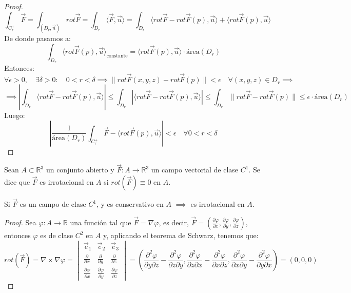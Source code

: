 \begin{proof}
    $$ \int_{C_r^+} \vec{F} = \int_{(D_r, \vec{n})} rot\vec{F} = \int_{D_r} \langle \vec{F}, \vec{u} \rangle = \int_{D_r} \langle rot\vec{F} - rot\vec{F} (p), \vec{u} \rangle + \langle rot\vec{F} (p), \vec{u} \rangle$$
    De donde pasamos a:
    $$ \int_{D_r} \langle rot\vec{F} (p), \vec{u} \rangle_{\text{constante}} = \langle rot\vec{F} (p), \vec{u} \rangle \cdot \text{área}(D_r)$$
    Entonces:
    $$ \forall \epsilon > 0, \quad \exists \delta > 0: \quad 0 < r < \delta \implies \lVert rot\vec{F} (x,y,z) - rot\vec{F} (p) \rVert < \epsilon \quad \forall (x,y,z) \in D_r \implies $$
    $$ \implies \left| \int_{D_r} \langle rot\vec{F} - rot\vec{F} (p), \vec{u} \rangle \right| \leq \int_{D_r} \left| \langle rot\vec{F} - rot\vec{F} (p), \vec{u} \rangle \right| \leq \int_{D_r} \lVert rot\vec{F} - rot\vec{F} (p) \rVert \leq \epsilon \cdot \text{área}(D_r)$$
    Luego:
    $$ \left| \frac{1}{\text{área}(D_r)} \int_{C_r^+} \vec{F} - \langle rot\vec{F} (p), \vec{u} \rangle \right| < \epsilon \quad \forall 0 < r < \delta$$
\end{proof}

\begin{definición}
    Sean $A \subset \mathbb{R}^3$ un conjunto abierto y $\vec{F} : A \to \mathbb{R}^3$ un campo vectorial de clase $C^1$. Se dice que $\vec{F}$ es irrotacional en $A$ si $rot(\vec{F}) \equiv 0$ en $A$.
\end{definición}

\begin{lema}
    Si $\vec{F}$ es un campo de clase $C^1$, y es conservativo en $A$ $\implies$ es irrotacional en $A$.
\end{lema}

\begin{proof}
    Sea $\varphi: A \to \mathbb{R}$ una función tal que $\vec{F} = \nabla \varphi$, es decir, $\vec{F} = \left( \frac{\partial \varphi}{\partial x}, \frac{\partial \varphi}{\partial y}, \frac{\partial \varphi}{\partial z} \right)$, entonces $\varphi$ es de clase $C^2$ en $A$ y, aplicando el teorema de Schwarz, tenemos que:
    $$ rot(\vec{F}) = \nabla \times \nabla \varphi = \begin{vmatrix}
        \vec{e}_1 & \vec{e}_2 & \vec{e}_3 \\
        \frac{\partial}{\partial x} & \frac{\partial}{\partial y} & \frac{\partial}{\partial z} \\
        \frac{\partial \varphi}{\partial x} & \frac{\partial \varphi}{\partial y} & \frac{\partial \varphi}{\partial z}
    \end{vmatrix} = \left( \frac{\partial^2 \varphi}{\partial y \partial z} - \frac{\partial^2 \varphi}{\partial z \partial y}, \frac{\partial^2 \varphi}{\partial z \partial x} - \frac{\partial^2 \varphi}{\partial x \partial z}, \frac{\partial^2 \varphi}{\partial x \partial y} - \frac{\partial^2 \varphi}{\partial y \partial x} \right) = (0,0,0)$$
\end{proof}

